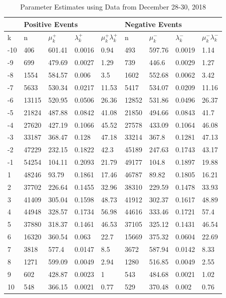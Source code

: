 \begin{table}[htbp]
\caption{Parameter Estimates using Data from December 28-30, 2018} \label{tab:parameters}
\begin{center}
\begin{tabular}{l|llll|llll}
\hline \hline
 & \multicolumn{4}{l|}{\textbf{Positive Events}} & \multicolumn{4}{l}{\textbf{Negative Events}} \\
\hline
k   & n & $\mu^+_k$ & $\lambda^+_k$ & $\mu^+_k \lambda^+_k$ & n  & $\mu^-_k$  & $\lambda^-_k$ & $\mu^-_k \lambda^-_k$  \\
\hline
-10 & 406   & 601.41 & 0.0016 & 0.94      & 493   & 597.76 & 0.0019 & 1.14       \\
-9  & 699   & 479.69 & 0.0027 & 1.29      & 739   & 446.6  & 0.0029 & 1.27       \\
-8  & 1554  & 584.57 & 0.006  & 3.5       & 1602  & 552.68 & 0.0062 & 3.42       \\
-7  & 5633  & 530.34 & 0.0217 & 11.53     & 5417  & 534.07 & 0.0209 & 11.16      \\
-6  & 13115 & 520.95 & 0.0506 & 26.36     & 12852 & 531.86 & 0.0496 & 26.37      \\
-5  & 21824 & 487.88 & 0.0842 & 41.08     & 21850 & 494.66 & 0.0843 & 41.7       \\
-4  & 27620 & 427.19 & 0.1066 & 45.52     & 27578 & 433.09 & 0.1064 & 46.08      \\
-3  & 33187 & 368.47 & 0.128  & 47.18     & 33214 & 367.8  & 0.1281 & 47.13      \\
-2  & 47229 & 232.15 & 0.1822 & 42.3      & 45189 & 247.63 & 0.1743 & 43.17      \\
-1  & 54254 & 104.11 & 0.2093 & 21.79     & 49177 & 104.8  & 0.1897 & 19.88      \\
1   & 48246 & 93.79  & 0.1861 & 17.46     & 46787 & 89.82  & 0.1805 & 16.21      \\
2   & 37702 & 226.64 & 0.1455 & 32.96     & 38310 & 229.59 & 0.1478 & 33.93      \\
3   & 41409 & 305.04 & 0.1598 & 48.73     & 41912 & 302.37 & 0.1617 & 48.89      \\
4   & 44948 & 328.57 & 0.1734 & 56.98     & 44616 & 333.46 & 0.1721 & 57.4       \\
5   & 37880 & 318.37 & 0.1461 & 46.53     & 37105 & 325.12 & 0.1431 & 46.54      \\
6   & 16320 & 360.54 & 0.063  & 22.7      & 15669 & 375.32 & 0.0604 & 22.69      \\
7   & 3818  & 577.4  & 0.0147 & 8.5       & 3672  & 587.94 & 0.0142 & 8.33       \\
8   & 1271  & 599.09 & 0.0049 & 2.94      & 1280  & 516.85 & 0.0049 & 2.55       \\
9   & 602   & 428.87 & 0.0023 & 1         & 543   & 484.68 & 0.0021 & 1.02       \\
10  & 548   & 366.15 & 0.0021 & 0.77      & 529   & 370.48 & 0.002  & 0.76      
\end{tabular}
\end{center}
\end{table}

